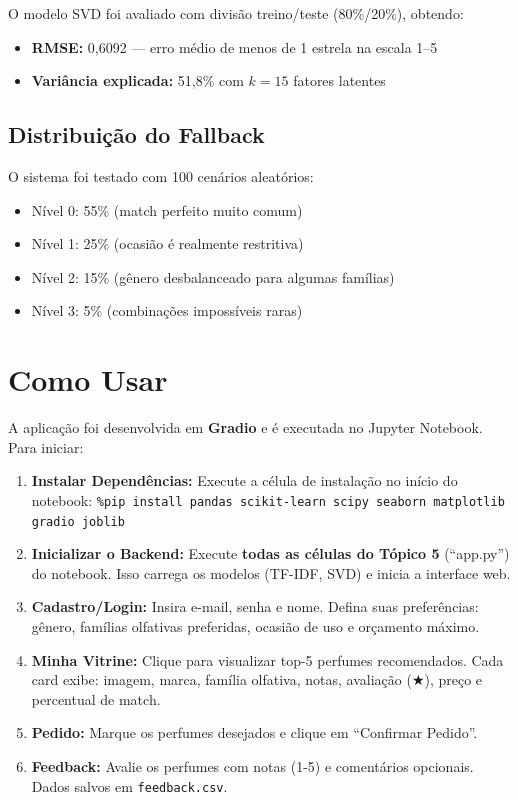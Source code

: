 \documentclass[12pt,a4paper]{article}
\begin{document}
O modelo SVD foi avaliado com divisão treino/teste (80\%/20\%), obtendo:

\begin{itemize}
    \item \textbf{RMSE:} 0,6092 — erro médio de menos de 1 estrela na escala 1–5
    \item \textbf{Variância explicada:} 51,8\% com $k=15$ fatores latentes
\end{itemize}


\subsection{Distribuição do Fallback}

O sistema foi testado com 100 cenários aleatórios:
\begin{itemize}
    \item Nível 0: 55\% (match perfeito muito comum)
    \item Nível 1: 25\% (ocasião é realmente restritiva)
    \item Nível 2: 15\% (gênero desbalanceado para algumas famílias)
    \item Nível 3: 5\% (combinações impossíveis raras)
\end{itemize}


\section{Como Usar}

A aplicação foi desenvolvida em \textbf{Gradio} e é executada no Jupyter Notebook. Para iniciar:

\begin{enumerate}
    \item \textbf{Instalar Dependências:} Execute a célula de instalação no início do notebook: \texttt{\%pip install pandas scikit-learn scipy seaborn matplotlib gradio joblib}

    \item \textbf{Inicializar o Backend:} Execute \textbf{todas as células do Tópico 5} (``app.py'') do notebook. Isso carrega os modelos (TF-IDF, SVD) e inicia a interface web.
    
    \item \textbf{Cadastro/Login:} Insira e-mail, senha e nome. Defina suas preferências: gênero, famílias olfativas preferidas, ocasião de uso e orçamento máximo.
    
    \item \textbf{Minha Vitrine:} Clique para visualizar top-5 perfumes recomendados. Cada card exibe: imagem, marca, família olfativa, notas, avaliação (★), preço e percentual de match.
    
    \item \textbf{Pedido:} Marque os perfumes desejados e clique em ``Confirmar Pedido''.
    
    \item \textbf{Feedback:} Avalie os perfumes com notas (1-5) e comentários opcionais. Dados salvos em \texttt{feedback.csv}.
\end{enumerate}
\end{document}
